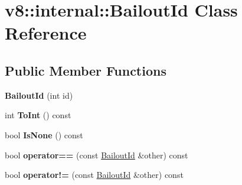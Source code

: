 \hypertarget{classv8_1_1internal_1_1_bailout_id}{}\section{v8\+:\+:internal\+:\+:Bailout\+Id Class Reference}
\label{classv8_1_1internal_1_1_bailout_id}
\subsection*{Public Member Functions}
\begin{DoxyCompactItemize}
\item 
{\bfseries Bailout\+Id} (int id)\hypertarget{classv8_1_1internal_1_1_bailout_id_a29bee41095d1f83d33c1e519877b324e}{}\label{classv8_1_1internal_1_1_bailout_id_a29bee41095d1f83d33c1e519877b324e}

\item 
int {\bfseries To\+Int} () const \hypertarget{classv8_1_1internal_1_1_bailout_id_a28600772827dde89522328e18caaef0c}{}\label{classv8_1_1internal_1_1_bailout_id_a28600772827dde89522328e18caaef0c}

\item 
bool {\bfseries Is\+None} () const \hypertarget{classv8_1_1internal_1_1_bailout_id_abaa5f387538060e4229834dd611b8a17}{}\label{classv8_1_1internal_1_1_bailout_id_abaa5f387538060e4229834dd611b8a17}

\item 
bool {\bfseries operator==} (const \hyperlink{classv8_1_1internal_1_1_bailout_id}{Bailout\+Id} \&other) const \hypertarget{classv8_1_1internal_1_1_bailout_id_ad56f5e5bca475897e778003958c1fc8a}{}\label{classv8_1_1internal_1_1_bailout_id_ad56f5e5bca475897e778003958c1fc8a}

\item 
bool {\bfseries operator!=} (const \hyperlink{classv8_1_1internal_1_1_bailout_id}{Bailout\+Id} \&other) const \hypertarget{classv8_1_1internal_1_1_bailout_id_a70b9c565a2c63cb954189ed581767f36}{}\label{classv8_1_1internal_1_1_bailout_id_a70b9c565a2c63cb954189ed581767f36}

\end{DoxyCompactItemize}
